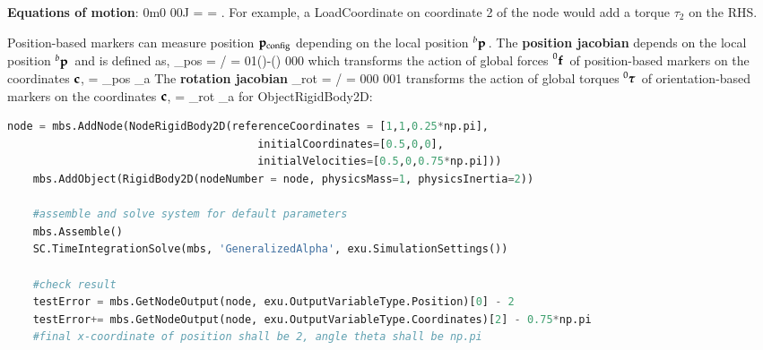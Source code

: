     \finishTable
    {\bf Equations of motion}:
    \be 
       {0}{m}{0} {0}{0}{J}  =  = \fv.
    \ee
    For example, a LoadCoordinate on coordinate 2 of the node would add a torque $\tau_2$ on the RHS.
    
    Position-based markers can measure position $\mathbf{p}_\mathrm{config}$ depending on the local position $\prescript{b}{}{\mathbf{p}}\,$. 
    The {\bf position jacobian} depends on the local position $\prescript{b}{}{\mathbf{p}}\,$ and is defined as,
    \be
      \Jm_{pos} = \partial \pv\cCur / \partial \cv\cCur =  
                                                             {0}{1}{\cos(\theta)-\sin(\theta)} {0}{0}{0}
    \ee
    which transforms the action of global forces $\prescript{0}{}{\mathbf{f}}\,$ of position-based markers on the coordinates $\mathbf{c}$,
    \be
      \Qm = \Jm_{pos} _a
    \ee
    The {\bf rotation jacobian}  
    \be
      \Jm_{rot} = \partial \pv\cCur / \partial \cv\cCur =  {0}{0}{0} {0}{0}{1}
    \ee
    transforms the action of global torques $\prescript{0}{}{\mbox{\boldmath $\tau$ \unboldmath}\!\!}\,$ of orientation-based markers on the coordinates $\mathbf{c}$,
    \be
      \Qm = \Jm_{rot} _a
    \ee
{} for ObjectRigidBody2D:
\pythonstyle
\begin{lstlisting}[language=Python, firstnumber=1]
    node = mbs.AddNode(NodeRigidBody2D(referenceCoordinates = [1,1,0.25*np.pi], 
                                       initialCoordinates=[0.5,0,0],
                                       initialVelocities=[0.5,0,0.75*np.pi]))
    mbs.AddObject(RigidBody2D(nodeNumber = node, physicsMass=1, physicsInertia=2))

    #assemble and solve system for default parameters
    mbs.Assemble()
    SC.TimeIntegrationSolve(mbs, 'GeneralizedAlpha', exu.SimulationSettings())

    #check result
    testError = mbs.GetNodeOutput(node, exu.OutputVariableType.Position)[0] - 2
    testError+= mbs.GetNodeOutput(node, exu.OutputVariableType.Coordinates)[2] - 0.75*np.pi
    #final x-coordinate of position shall be 2, angle theta shall be np.pi

\end{lstlisting}

